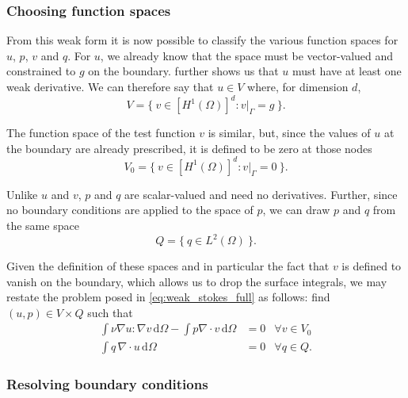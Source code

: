 \documentclass[thesis]{subfiles}
\begin{document}
\subsubsection{Choosing function spaces}

From this weak form it is now possible to classify the various function spaces for $u$, $p$, $v$ and $q$.
For $u$, we already know that the space must be vector-valued and constrained to $g$ on the boundary.
 further shows us that $u$ must have at least one weak derivative.
We can therefore say that $u \in V$ where, for dimension $d$,
\begin{equation}
  V = \{ \ v \in [H^1(\Omega)]^d : v |_{\Gamma} = g \ \}.
\end{equation}

The function space of the test function $v$ is similar, but, since the values of $u$ at the boundary are already prescribed, it is defined to be zero at those nodes
\begin{equation} \label{eq:vspace}
  V_0 = \{\ v \in [H^1(\Omega)]^d : v|_{\Gamma} = 0 \ \}.
\end{equation}

Unlike $u$ and $v$, $p$ and $q$ are scalar-valued and need no derivatives.
Further, since no boundary conditions are applied to the space of $p$, we can draw $p$ and $q$ from the same space
\begin{equation}
  Q = \{ \ q \in L^2(\Omega) \ \}.
  \label{eq:stokes_pressure_space}
\end{equation}

Given the definition of these spaces and in particular the fact that $v$ is defined to vanish on the boundary, which allows us to drop the surface integrals, we may restate the problem posed in \cref{eq:weak_stokes_full} as follows: find $(u, p) \in V \times Q$ such that
\begin{equation} \label{eq:weak_stokes_no_surface_terms}
  \begin{aligned}
    \int \nu \nabla u : \nabla v \, \textrm{d}\Omega
    - \int p \nabla \cdot v \, \textrm{d}\Omega
    &= 0
    &\forall v \in V_0 \\
    \int q \, \nabla \cdot u \, \textrm{d}\Omega
    &= 0
    &\forall q \in Q.
  \end{aligned}
\end{equation}

\subsubsection{Resolving boundary conditions}
\end{document}
